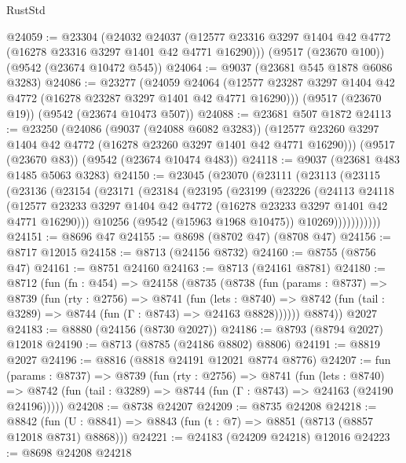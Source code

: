 \begin{lexlean}{RustStd}
\begin{coremodule}
@24059 := @23304
    (@24032
      @24037
      (@12577 @23316 @3297 @1404 @42 @4772 (@16278 @23316 @3297 @1401 @42 @4771 @16290)))
    (@9517 (@23670 @100))
    (@9542 (@23674 @10472 @545))
@24064 := @9037 (@23681 @545 @1878 @6086 @3283)
@24086 := @23277
    (@24059
      @24064
      (@12577 @23287 @3297 @1404 @42 @4772 (@16278 @23287 @3297 @1401 @42 @4771 @16290)))
    (@9517 (@23670 @19))
    (@9542 (@23674 @10473 @507))
@24088 := @23681 @507 @1872
@24113 := @23250
    (@24086
      (@9037 (@24088 @6082 @3283))
      (@12577 @23260 @3297 @1404 @42 @4772 (@16278 @23260 @3297 @1401 @42 @4771 @16290)))
    (@9517 (@23670 @83))
    (@9542 (@23674 @10474 @483))
@24118 := @9037 (@23681 @483 @1485 @5063 @3283)
@24150 := @23045
    (@23070
      (@23111
        (@23113
          (@23115
            (@23136
              (@23154
                (@23171
                  (@23184
                    (@23195
                      (@23199
                        (@23226
                          (@24113
                            @24118
                            (@12577
                              @23233
                              @3297
                              @1404
                              @42
                              @4772
                              (@16278 @23233 @3297 @1401 @42 @4771 @16290)))
                          @10256
                          (@9542 (@15963 @1968 @10475))
                          @10269)))))))))))
@24151 := @8696 @47
@24155 := @8698 (@8702 @47) (@8708 @47)
@24156 := @8717 @12015
@24158 := @8713 (@24156 @8732)
@24160 := @8755 (@8756 @47)
@24161 := @8751 @24160
@24163 := @8713 (@24161 @8781)
@24180 := @8712
    (fun (fn : @454) =>
    @24158
      (@8735
        (@8738
          (fun (params : @8737) =>
          @8739
            (fun (rty : @2756) =>
            @8741
              (fun (lets : @8740) =>
              @8742 (fun (tail : @3289) => @8744 (fun (Γ : @8743) => @24163 @8828))))))
        @8874))
    @2027
@24183 := @8880 (@24156 (@8730 @2027))
@24186 := @8793 (@8794 @2027) @12018
@24190 := @8713 (@8785 (@24186 @8802) @8806)
@24191 := @8819 @2027
@24196 := @8816 (@8818 @24191 @12021 @8774 @8776)
@24207 := fun (params : @8737) =>
  @8739
    (fun (rty : @2756) =>
    @8741
      (fun (lets : @8740) =>
      @8742 (fun (tail : @3289) => @8744 (fun (Γ : @8743) => @24163 (@24190 @24196)))))
@24208 := @8738 @24207
@24209 := @8735 @24208
@24218 := @8842
    (fun (U : @8841) => @8843 (fun (t : @7) => @8851 (@8713 (@8857 @12018 @8731) @8868)))
@24221 := @24183 (@24209 @24218) @12016
@24223 := @8698 @24208 @24218

\end{coremodule}
\end{lexlean}
